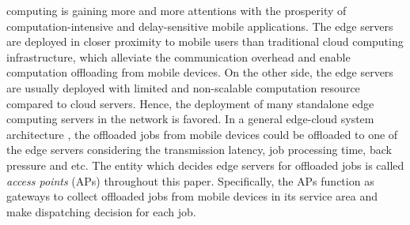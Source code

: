 
 computing is gaining more and more attentions with the prosperity of computation-intensive and delay-sensitive mobile applications. %
The edge servers are deployed in closer proximity to mobile users than traditional cloud computing infrastructure, which alleviate the communication overhead and enable computation offloading from mobile devices.
On the other side, the edge servers are usually deployed with limited and non-scalable computation resource compared to cloud servers.
Hence, the deployment of many standalone edge computing servers in the network is favored.
In a general edge-cloud system architecture \cite{MEC-SURVEY}, the offloaded jobs from mobile devices could be offloaded to one of the edge servers considering the transmission latency, job processing time, back pressure and etc.
The entity which decides edge servers for offloaded jobs is called \emph{access points} (APs) throughout this paper.
Specifically, the APs function as gateways to collect offloaded jobs from mobile devices in its service area and make dispatching decision for each job.

